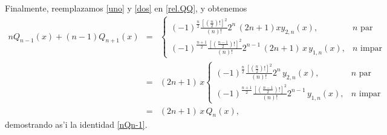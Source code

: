 Finalmente, reemplazamos \eqref{uno} y \eqref{dos} en \eqref{rel.QQ}, y obtenemos
\begin{eqnarray}
nQ_{n-1}(x)+(n-1)Q_{n+1}(x) &=&
   \begin{cases}
	(-1)^{\frac{n}{2}}\frac{[(\frac{n}{2})!]^2}{(n)!} 2^{n} \,(2n+1)xy_{2,n}(x), & n \text{ par}\\
	(-1)^{\frac{n+1}{2}}\frac{\left[\left(\frac{n-1}{2}\right)!\right]^2}{(n)!}2^{n-1}\, (2n+1)\,x\,y_{1,n}(x), & n \text{ impar}
	\end{cases}\\ 
	&=&(2n+1)\,x
   \begin{cases}
	(-1)^{\frac{n}{2}}\frac{[(\frac{n}{2})!]^2}{(n)!} 2^{n} \,y_{2,n}(x), & n \text{ par}\\
	(-1)^{\frac{n+1}{2}}\frac{\left[\left(\frac{n-1}{2}\right)!\right]^2}{(n)!}2^{n-1}\,y_{1,n}(x), & n \text{ impar}
	\end{cases} \\
	&=&  (2n+1)\,x\,Q_n(x),
\end{eqnarray}
demostrando as'i la identidad \eqref{nQn-1}.


